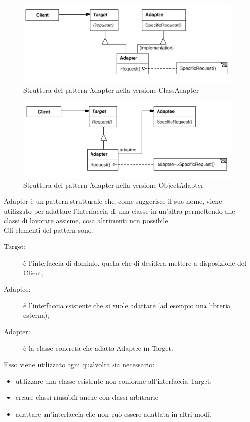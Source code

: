  \label{app:adapter}
	\begin{figure}[H]\centering
    \includegraphics[scale=0.7]{SpecificaTecnica/Pics/ClassAdapter}
    \caption{Struttura del pattern Adapter nella versione ClassAdapter}
	\end{figure}
	\begin{figure}[H]\centering
    \includegraphics[scale=0.7]{SpecificaTecnica/Pics/ObjectAdapter}
    \caption{Struttura del pattern Adapter nella versione ObjectAdapter}
	\end{figure}
Adapter è un pattern strutturale che, come suggerisce il suo nome, viene utilizzato per adattare l'interfaccia di una classe in un'altra permettendo alle classi di lavorare assieme, cosa altrimenti non possibile.\\
Gli elementi del pattern sono:
\begin{description}
\item[Target:] è l'interfaccia di dominio, quella che di desidera mettere a disposizione del Client;
\item[Adaptee:] è l'interfaccia esistente che si vuole adattare (ad esempio una libreria esterna);
\item[Adapter:] è la classe concreta che adatta Adaptee in Target.
\end{description}

Esso viene utilizzato ogni qualvolta sia necessario:
\begin{itemize}
\item utilizzare una classe esistente non conforme all'interfaccia Target;
\item creare classi riusabili anche con classi arbitrarie;
\item adattare un'interfaccia che non può essere adattata in altri modi.
\end{itemize}

